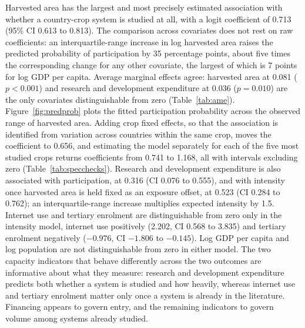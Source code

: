 \documentclass[ASNA,twocolumn]{USG}
\begin{document}
Harvested area has the largest and most precisely estimated association with whether a
country-crop system is studied at all, with a logit coefficient of 0.713 (95\% CI 0.613 to
0.813). The comparison across covariates does not rest on raw coefficients: an
interquartile-range increase in log harvested area raises the predicted probability of
participation by 35 percentage points, about five times the corresponding change for any
other covariate, the largest of which is 7
points for log GDP per capita. Average marginal effects agree: harvested area at 0.081 ($p < 0.001$) and research and
development expenditure at 0.036 ($p = 0.010$) are the only covariates distinguishable from zero
(Table~\ref{tab:ame}). Figure~\ref{fig:predprob} plots the fitted participation probability
across the observed range of harvested area. Adding crop fixed effects, so that the association is identified from variation across
countries within the same crop, moves the coefficient to 0.656, and estimating the model
separately for each of the five most studied crops returns coefficients from 0.741 to 1.168, all
with intervals excluding zero (Table~\ref{tab:specchecks}). Research and development expenditure is also associated with participation, at 0.316 (CI 0.076 to
0.555), and with intensity once harvested area is held fixed as an exposure offset, at 0.523 (CI
0.284 to 0.762); an interquartile-range increase multiplies expected intensity by 1.5. Internet
use and tertiary enrolment are distinguishable from zero only in the intensity model, internet use
positively (2.202, CI 0.568 to 3.835) and tertiary enrolment negatively ($-0.976$, CI $-1.806$ to
$-0.145$). Log GDP per capita and log population are not distinguishable from zero in either
model. The two capacity indicators that behave differently across the two outcomes are
informative about what they measure: research and development expenditure predicts both whether a
system is studied and how heavily, whereas internet use and tertiary enrolment matter only once a
system is already in the literature. Financing appears to govern entry, and the remaining
indicators to govern volume among systems already studied.
\end{document}
